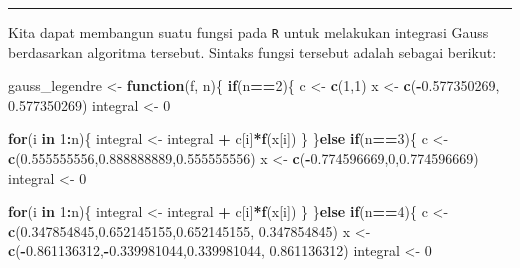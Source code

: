 \documentclass[
]{book}
\newenvironment{Shaded}{\begin{snugshade}}{\end{snugshade}}
\newcommand{\ControlFlowTok}[1]{\textcolor[rgb]{0.13,0.29,0.53}{\textbf{#1}}}
\newcommand{\DecValTok}[1]{\textcolor[rgb]{0.00,0.00,0.81}{#1}}
\newcommand{\FloatTok}[1]{\textcolor[rgb]{0.00,0.00,0.81}{#1}}
\newcommand{\FunctionTok}[1]{\textcolor[rgb]{0.13,0.29,0.53}{\textbf{#1}}}
\newcommand{\NormalTok}[1]{#1}
\newcommand{\OtherTok}[1]{\textcolor[rgb]{0.56,0.35,0.01}{#1}}
\newcommand{\SpecialCharTok}[1]{\textcolor[rgb]{0.81,0.36,0.00}{\textbf{#1}}}
\theoremstyle{definition}
\theoremstyle{definition}
\theoremstyle{definition}
\theoremstyle{definition}
\theoremstyle{remark}
\begin{document}
\begin{center}\rule{0.5\linewidth}{0.5pt}\end{center}

Kita dapat membangun suatu fungsi pada \texttt{R} untuk melakukan integrasi Gauss berdasarkan algoritma tersebut. Sintaks fungsi tersebut adalah sebagai berikut:

\begin{Shaded}
\begin{Highlighting}[]
\NormalTok{gauss\_legendre }\OtherTok{\textless{}{-}} \ControlFlowTok{function}\NormalTok{(f, n)\{}
    \ControlFlowTok{if}\NormalTok{(n}\SpecialCharTok{==}\DecValTok{2}\NormalTok{)\{}
\NormalTok{      c }\OtherTok{\textless{}{-}} \FunctionTok{c}\NormalTok{(}\DecValTok{1}\NormalTok{,}\DecValTok{1}\NormalTok{)}
\NormalTok{      x }\OtherTok{\textless{}{-}} \FunctionTok{c}\NormalTok{(}\SpecialCharTok{{-}}\FloatTok{0.577350269}\NormalTok{, }\FloatTok{0.577350269}\NormalTok{)}
\NormalTok{      integral }\OtherTok{\textless{}{-}} \DecValTok{0}
      
      \ControlFlowTok{for}\NormalTok{(i }\ControlFlowTok{in} \DecValTok{1}\SpecialCharTok{:}\NormalTok{n)\{}
\NormalTok{        integral }\OtherTok{\textless{}{-}}\NormalTok{ integral }\SpecialCharTok{+}\NormalTok{ c[i]}\SpecialCharTok{*}\FunctionTok{f}\NormalTok{(x[i])}
\NormalTok{      \}}
\NormalTok{    \}}\ControlFlowTok{else} \ControlFlowTok{if}\NormalTok{(n}\SpecialCharTok{==}\DecValTok{3}\NormalTok{)\{}
\NormalTok{      c }\OtherTok{\textless{}{-}} \FunctionTok{c}\NormalTok{(}\FloatTok{0.555555556}\NormalTok{,}\FloatTok{0.888888889}\NormalTok{,}\FloatTok{0.555555556}\NormalTok{)}
\NormalTok{      x }\OtherTok{\textless{}{-}} \FunctionTok{c}\NormalTok{(}\SpecialCharTok{{-}}\FloatTok{0.774596669}\NormalTok{,}\DecValTok{0}\NormalTok{,}\FloatTok{0.774596669}\NormalTok{)}
\NormalTok{      integral }\OtherTok{\textless{}{-}} \DecValTok{0}
      
      \ControlFlowTok{for}\NormalTok{(i }\ControlFlowTok{in} \DecValTok{1}\SpecialCharTok{:}\NormalTok{n)\{}
\NormalTok{        integral }\OtherTok{\textless{}{-}}\NormalTok{ integral }\SpecialCharTok{+}\NormalTok{ c[i]}\SpecialCharTok{*}\FunctionTok{f}\NormalTok{(x[i])}
\NormalTok{      \}}
\NormalTok{    \}}\ControlFlowTok{else} \ControlFlowTok{if}\NormalTok{(n}\SpecialCharTok{==}\DecValTok{4}\NormalTok{)\{}
\NormalTok{      c }\OtherTok{\textless{}{-}} \FunctionTok{c}\NormalTok{(}\FloatTok{0.347854845}\NormalTok{,}\FloatTok{0.652145155}\NormalTok{,}\FloatTok{0.652145155}\NormalTok{,}
             \FloatTok{0.347854845}\NormalTok{)}
\NormalTok{      x }\OtherTok{\textless{}{-}} \FunctionTok{c}\NormalTok{(}\SpecialCharTok{{-}}\FloatTok{0.861136312}\NormalTok{,}\SpecialCharTok{{-}}\FloatTok{0.339981044}\NormalTok{,}\FloatTok{0.339981044}\NormalTok{,}
             \FloatTok{0.861136312}\NormalTok{)}
\NormalTok{      integral }\OtherTok{\textless{}{-}} \DecValTok{0}
      

\end{Highlighting}
\end{Shaded}
\end{document}
